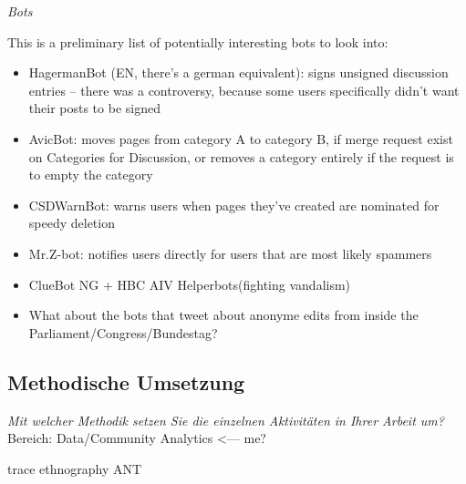 \documentclass[pdftex,a4paper,11pt]{scrartcl}
\begin{document}
\emph{Bots}

This is a preliminary list of potentially interesting bots to look into:

\begin{itemize}
  \item HagermanBot (EN, there's a german equivalent): signs unsigned discussion entries -- there was a
  controversy, because some users specifically didn't want their posts to be
  signed
  \item AvicBot: moves pages from category A to category B, if merge request exist on Categories for Discussion, or removes a category entirely if the request is to empty the category
  \item CSDWarnBot: warns users when pages they've created are nominated for speedy deletion
  \item Mr.Z-bot: notifies users directly for users that are most likely spammers
  \item ClueBot NG + HBC AIV Helperbots(fighting vandalism)
  \item What about the bots that tweet about anonyme edits from inside the Parliament/Congress/Bundestag?
\end{itemize}

\subsection{Methodische Umsetzung}
\noindent \emph{Mit welcher Methodik setzen Sie die einzelnen Aktivitäten in Ihrer Arbeit um?}
Bereich: Data/Community Analytics <--- me?

trace ethnography
ANT
\end{document}
